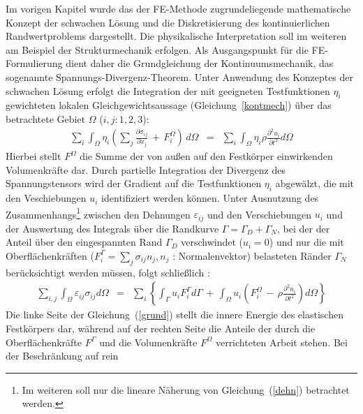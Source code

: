 Im vorigen Kapitel wurde das der FE-Methode zugrundeliegende mathematische
Konzept der schwachen Lösung und die Diskretisierung des kontinuierlichen
Randwertproblems dargestellt.
Die physikalische Interpretation soll im weiteren am Beispiel
der Strukturmechanik erfolgen. Als Ausgangspunkt für die FE-Formulierung
dient daher die Grundgleichung der Kontinuumsmechanik, das sogenannte
\glqq Spannungs-Divergenz-Theorem\grqq. Unter Anwendung des Konzeptes der
schwachen Lösung erfolgt die Integration der mit geeigneten Testfunktionen
$\eta_{i}$ gewichteten lokalen Gleichgewichtsaussage
(Gleichung~\ref{kontmech}) über das betrachtete Gebiet $\Omega$
($i,j: 1, 2, 3$):
\begin{eqnarray}
\label{ablelmst}
 \sum _{i} \int_{\Omega} \eta_{i} \left( \sum_{j}
 \frac{\partial \sigma_{ij}}{\partial x_{j}}  %
 \, + \, F_{i}^{\Omega} \right) \, d\Omega
 & = &  \sum_{i}
 \int_{\Omega} \eta_{i} \rho \frac{\partial^{2}u_{i}}{\partial t^{2}}d\Omega
\end{eqnarray}
Hierbei stellt $F^{\Omega}$ die Summe der von außen auf den Festkörper
einwirkenden Volumenkräfte dar. Durch partielle Integration der Divergenz
des Spannungstensors %
wird der Gradient auf die Testfunktionen $\eta_{i}$ abgewälzt, die mit den
Veschiebungen $u_{i}$ identifiziert werden können. Unter Ausnutzung des
Zusammenhangs\footnote{Im weiteren soll nur die lineare Näherung von
Gleichung~(\ref{dehn}) betrachtet werden.} zwischen den Dehnungen
$\varepsilon_{ij}$ und den Verschiebungen $u_{i}$ und der Auswertung des
Integrals über die Randkurve $\Gamma = \Gamma_{D} + \Gamma_{N}$, bei der
der Anteil über den eingespannten Rand $\Gamma_{D}$ verschwindet
($u_{i}=0$) und nur die mit Oberflächenkräften
($F_{i}^{\Gamma} = \sum_{j} \sigma_{ij} n_{j}, n_{j}$ : Normalenvektor)
belasteten Ränder $\Gamma_{N}$ berücksichtigt werden müssen, folgt
schließlich \cite{Mat93}:
\begin{eqnarray}
\label{grund}
  \sum_{i,j} \int_{\Omega} \varepsilon_{ij} \sigma_{ij} d\Omega
  & = &
  \sum_{i} \left\{
  \int_{\Gamma} u_{i} F^{\Gamma}_{i} d\Gamma \, + \,
  \int_{\Omega} u_{i} \left( F^{\Omega}_{i} \, - \,
  \rho \frac{\partial^{2} u_{i}}{\partial t^{2}} \right) d\Omega
  \right\}
\end{eqnarray}
Die linke Seite der Gleichung~(\ref{grund}) stellt die innere Energie
des elastischen Festkörpers dar, während auf der rechten Seite die Anteile
der durch die Oberflächenkräfte $F^{\Gamma}$ und die Volumenkräfte
$F^{\Omega}$ verrichteten Arbeit stehen. Bei der Beschränkung auf rein
